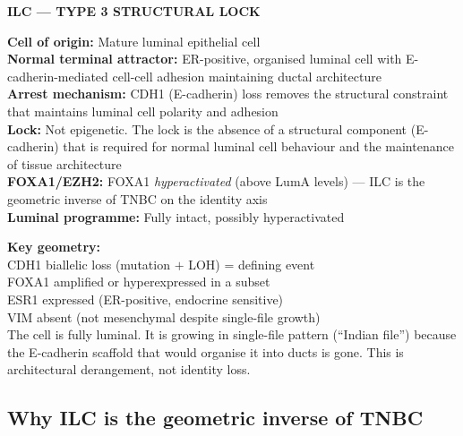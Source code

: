\documentclass[12pt, a4paper]{article}
\begin{document}
\begin{center}
\colorbox{mechanismbox}{
\begin{minipage}{0.85\textwidth}
\vspace{0.5em}
\textbf{ILC --- TYPE 3 STRUCTURAL LOCK}

\medskip
\textbf{Cell of origin:} Mature luminal epithelial cell\\
\textbf{Normal terminal attractor:} ER-positive,
organised luminal cell with E-cadherin-mediated
cell-cell adhesion maintaining ductal architecture\\
\textbf{Arrest mechanism:} CDH1 (E-cadherin) loss
removes the structural constraint that maintains
luminal cell polarity and adhesion\\
\textbf{Lock:} Not epigenetic. The lock is the
absence of a structural component (E-cadherin)
that is required for normal luminal cell behaviour
and the maintenance of tissue architecture\\
\textbf{FOXA1/EZH2:} FOXA1 \textit{hyperactivated}
(above LumA levels) --- ILC is the geometric
inverse of TNBC on the identity axis\\
\textbf{Luminal programme:} Fully intact, possibly
hyperactivated

\medskip
\textbf{Key geometry:}\\
CDH1 biallelic loss (mutation $+$ LOH) = defining event\\
FOXA1 amplified or hyperexpressed in a subset\\
ESR1 expressed (ER-positive, endocrine sensitive)\\
VIM absent (not mesenchymal despite single-file growth)\\
The cell is fully luminal. It is growing in single-file
pattern (``Indian file'') because the E-cadherin
scaffold that would organise it into ducts is gone.
This is architectural derangement, not identity loss.
\vspace{0.5em}
\end{minipage}
}
\end{center}

\subsection{Why ILC is the geometric inverse of TNBC}
\end{document}
